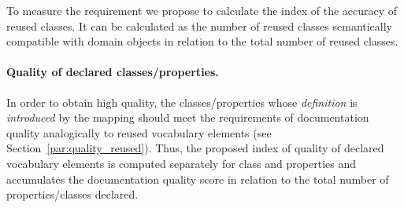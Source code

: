 %
To measure the requirement we propose to calculate the index of the accuracy of reused classes.
It can be calculated as the number of reused classes semantically compatible with domain objects in relation to the total number of reused classes.

\paragraph{Quality of declared classes/properties.}
In order to obtain high quality, the classes/properties whose \emph{definition} is \emph{introduced} by the mapping should meet the requirements of documentation quality analogically to reused vocabulary elements (see Section~\ref{par:quality_reused}).
Thus, the proposed index of quality of declared vocabulary elements is computed separately for class and properties and accumulates the documentation quality score in relation to the total number of properties/classes declared.

